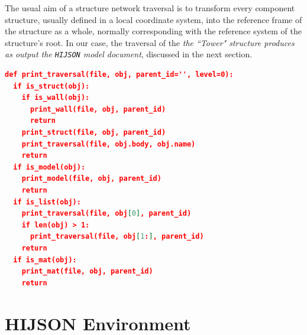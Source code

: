 \documentclass[]{egpubl}
\begin{document}
The usual aim of a structure network traversal is to transform every component structure, usually defined in a local coordinate system, into the reference frame of the structure as a whole, normally corresponding with the reference system of the structure's root. 
In our case, the traversal of the
\emph{the ``Tower" structure produces as output the \texttt{HIJSON} model document}, discussed in the next section. 

\begin{lstlisting}[language=json, label={lst:feature-collection-example}, captionpos=b, basicstyle=\ttfamily\scriptsize, caption=Algorithm producing a HIJSON file.]
def print_traversal(file, obj, parent_id='', level=0): 
  if is_struct(obj):
    if is_wall(obj):
      print_wall(file, obj, parent_id)
      return
    print_struct(file, obj, parent_id)
    print_traversal(file, obj.body, obj.name)
    return
  if is_model(obj):
    print_model(file, obj, parent_id)
    return
  if is_list(obj):
    print_traversal(file, obj[0], parent_id)
    if len(obj) > 1:
      print_traversal(file, obj[1:], parent_id)
    return
  if is_mat(obj):
    print_mat(file, obj, parent_id)
    return
\end{lstlisting}

\section{HIJSON Environment}
\end{document}
